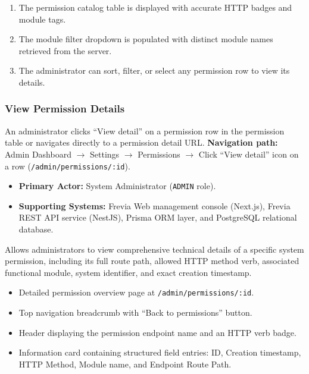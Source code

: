 \begin{enumerate}[leftmargin=1.6em,topsep=3pt,itemsep=2pt,parsep=0pt]
    \item The permission catalog table is displayed with accurate HTTP badges and module tags.
    \item The module filter dropdown is populated with distinct module names retrieved from the server.
    \item The administrator can sort, filter, or select any permission row to view its details.
\end{enumerate}

\subsubsection{ View Permission Details}

An administrator clicks ``View detail'' on a permission row in the permission table or navigates directly to a permission detail URL.\newline
\textbf{Navigation path:} Admin Dashboard $\rightarrow$ Settings $\rightarrow$ Permissions $\rightarrow$ Click ``View detail'' icon on a row (\texttt{/admin/permissions/:id}).


\begin{itemize}[leftmargin=1.6em,topsep=3pt,itemsep=2pt,parsep=0pt,label=$\bullet$]
    \item \textbf{Primary Actor:} System Administrator (\texttt{ADMIN} role).
    \item \textbf{Supporting Systems:} Frevia Web management console (Next.js), Frevia REST API service (NestJS), Prisma ORM layer, and PostgreSQL relational database.
\end{itemize}

\noindent Allows administrators to view comprehensive technical details of a specific system permission, including its full route path, allowed HTTP method verb, associated functional module, system identifier, and exact creation timestamp.

\begin{itemize}[leftmargin=1.6em,topsep=3pt,itemsep=2pt,parsep=0pt,label=$\bullet$]
    \item Detailed permission overview page at \texttt{/admin/permissions/:id}.
    \item Top navigation breadcrumb with ``Back to permissions'' button.
    \item Header displaying the permission endpoint name and an HTTP verb badge.
    \item Information card containing structured field entries: ID, Creation timestamp, HTTP Method, Module name, and Endpoint Route Path.
\end{itemize}

